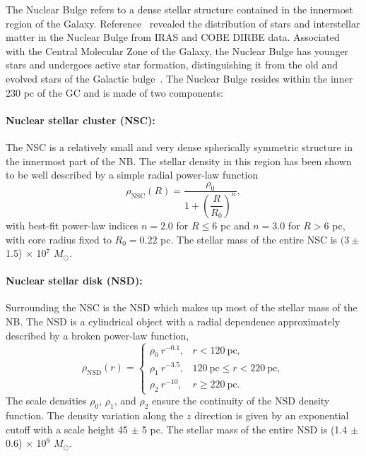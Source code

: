 \documentclass[doublespace,nopageskip]{VTthesis} %
\begin{document}
The Nuclear Bulge refers to a dense stellar structure contained in the innermost region of the Galaxy. 
Reference~\cite{2002A&A...384..112L} revealed the distribution of stars and interstellar matter in the Nuclear Bulge from IRAS and COBE DIRBE data. Associated with the Central Molecular Zone of the Galaxy, the Nuclear Bulge has younger stars and undergoes active star formation, distinguishing it from the old and evolved stars of the Galactic bulge~\cite{2002A&A...384..112L}. 
The Nuclear Bulge resides within the inner 230 pc of the GC and is made of two components:

\paragraph{Nuclear stellar cluster (NSC):} The NSC is a relatively small and very dense spherically symmetric structure in the innermost part of the NB. The stellar density in this region has been shown~\cite{Launhardt:2002tx} to be well described by a simple radial power-law function
\begin{equation}\label{eq:NSC}
  \rho_{\text{NSC}}(R)=\dfrac{\rho_0}{1+\left(\dfrac{R}{R_0}\right)^{n}},
\end{equation}
with best-fit power-law indices $n = 2.0$ for $R \leq 6$ pc and $n = 3.0$ for $R > 6$ pc, with core radius fixed to $R_0 = 0.22$ pc. The stellar mass of the entire NSC is $(3\pm$ 1.5) $\times$ 10$^7$ $M_\odot$.

\paragraph{Nuclear stellar disk (NSD):} Surrounding the NSC is the NSD which makes up most of the stellar mass of the NB. The NSD is a cylindrical object with a radial dependence approximately described by a broken power-law function,
\begin{equation}\label{eq:rhonsd}
  \rho_{\text{NSD}}(r) = \begin{cases}
    \rho_0\ r^{-0.1}, & r < 120\ \text{pc},\\
    \rho_1\ r^{-3.5}, & 120\ \text{pc} \leq r < 220\ \text{pc},\\
    \rho_2\ r^{-10}, & r \geq 220\ \text{pc}.
  \end{cases}
\end{equation}
The scale densities $\rho_0$, $\rho_1$, and $\rho_2$ ensure the continuity of the NSD density function. The density variation along the $z$ direction is given by an exponential cutoff with a scale height 45 $\pm$ 5 pc. The stellar mass of the entire NSD is (1.4 $\pm$ 0.6) $\times$ 10$^9$ $M_\odot$.
\end{document}
